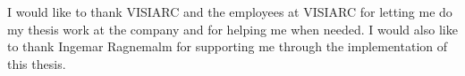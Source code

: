 \begin{acknowledgments}
I would like to thank VISIARC and the employees at VISIARC for letting me do my thesis work at the company and for helping me when needed. I would also like to thank Ingemar Ragnemalm for supporting me through the implementation of this thesis. 
\end{acknowledgments}
